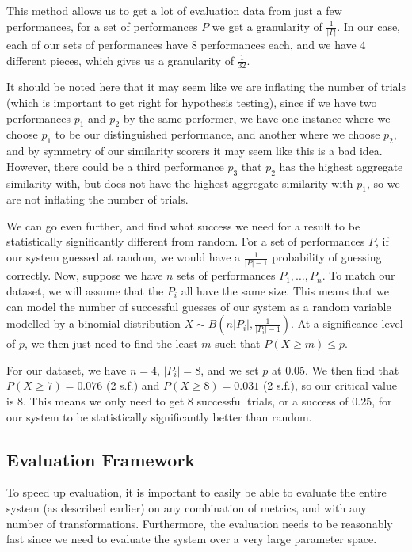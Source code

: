 \documentclass[oneside, class=book, 12pt, crop=false]{standalone}
\begin{document}
This method allows us to get a lot of evaluation data from just a few performances, for a set of performances $P$ we get a granularity of $\frac{1}{|P|}$. In our case, each of our sets of performances have 8 performances each, and we have 4 different pieces, which gives us a granularity of $\frac{1}{32}$.

It should be noted here that it may seem like we are inflating the number of trials (which is important to get right for hypothesis testing), since if we have two performances $p_1$ and $p_2$ by the same performer, we have one instance where we choose $p_1$ to be our distinguished performance, and another where we choose $p_2$, and by symmetry of our similarity scorers it may seem like this is a bad idea. However, there could be a third performance $p_3$ that $p_2$ has the highest aggregate similarity with, but does not have the highest aggregate similarity with $p_1$, so we are not inflating the number of trials.


We can go even further, and find what success we need for a result to be statistically significantly different from random. For a set of performances $P$, if our system guessed at random, we would have a $\frac{1}{|P|-1}$ probability of guessing correctly. Now, suppose we have $n$ sets of performances $P_1, \ldots, P_n$. To match our dataset, we will assume that the $P_i$ all have the same size. This means that we can model the number of successful guesses of our system as a random variable modelled by a binomial distribution $X \sim B(n|P_i|, \frac{1}{|P_i|-1})$. At a significance level of $p$, we then just need to find the least $m$ such that $P(X \geq m) \leq p$.

For our dataset, we have $n=4$, $|P_i| = 8$, and we set $p$ at 0.05. We then find that $P(X \geq 7) = 0.076$ (2 s.f.) and $P(X \geq 8) = 0.031$ (2 s.f.), so our critical value is 8. This means we only need to get 8 successful trials, or a success of 0.25, for our system to be statistically significantly better than random.

\subsection{Evaluation Framework}\label{sec:evaluation framework}

To speed up evaluation, it is important to easily be able to evaluate the entire system (as described earlier) on any combination of metrics, and with any number of transformations. Furthermore, the evaluation needs to be reasonably fast since we need to evaluate the system over a very large parameter space.
\end{document}
